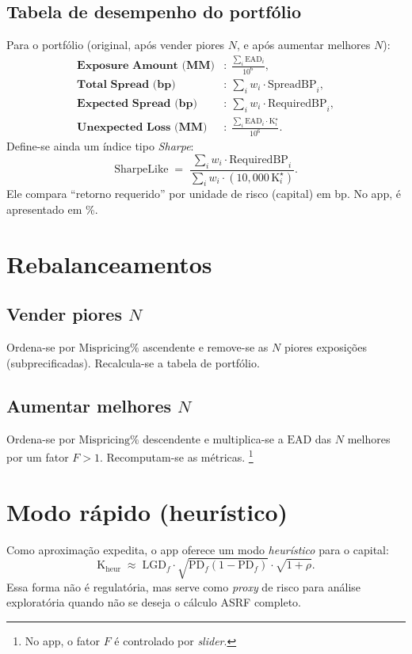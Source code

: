 \documentclass[11pt,a4paper]{article}
\newcommand{\PD}{\mathrm{PD}}
\newcommand{\LGD}{\mathrm{LGD}}
\newcommand{\EAD}{\mathrm{EAD}}
\newcommand{\Kcap}{\mathrm{K}}
\newcommand{\Rho}{\rho}
\begin{document}
\subsection{Tabela de desempenho do portfólio}
Para o portfólio (original, após vender piores \(N\), e após aumentar melhores \(N\)):
\begin{align}
\textbf{Exposure Amount (MM)} &: \ \frac{\sum_i \EAD_i}{10^6},\\
\textbf{Total Spread (bp)} &: \ \sum_i w_i \cdot \mathrm{SpreadBP}_i,\\
\textbf{Expected Spread (bp)} &: \ \sum_i w_i \cdot \mathrm{RequiredBP}_i,\\
\textbf{Unexpected Loss (MM)} &: \ \frac{\sum_i \EAD_i \cdot \Kcap_i^\star}{10^6}.
\end{align}
Define-se ainda um índice tipo \emph{Sharpe}:
\begin{equation}
\mathrm{SharpeLike} \;=\; \frac{\sum_i w_i \cdot \mathrm{RequiredBP}_i}{\sum_i w_i \cdot (10{,}000\,\Kcap_i^\star)}.
\end{equation}
Ele compara ``retorno requerido'' por unidade de risco (capital) em bp. No app, é apresentado em \%.

\section{Rebalanceamentos}
\subsection{Vender piores \(N\)}
Ordena-se por \(\mathrm{Mispricing\%}\) ascendente e remove-se as \(N\) piores exposições (subprecificadas). Recalcula-se a tabela de portfólio.

\subsection{Aumentar melhores \(N\)}
Ordena-se por \(\mathrm{Mispricing\%}\) descendente e multiplica-se a \(\EAD\) das \(N\) melhores por um fator \(F>1\). Recomputam-se as métricas.%
\footnote{No app, o fator \(F\) é controlado por \emph{slider}.}

\section{Modo rápido (heurístico)}
Como aproximação expedita, o app oferece um modo \emph{heurístico} para o capital:
\begin{equation}
\Kcap_{\text{heur}} \;\approx\; \LGD_f \cdot \sqrt{\PD_f (1-\PD_f)} \cdot \sqrt{1+\Rho}.
\end{equation}
Essa forma não é regulatória, mas serve como \emph{proxy} de risco para análise exploratória quando não se deseja o cálculo ASRF completo.
\end{document}
